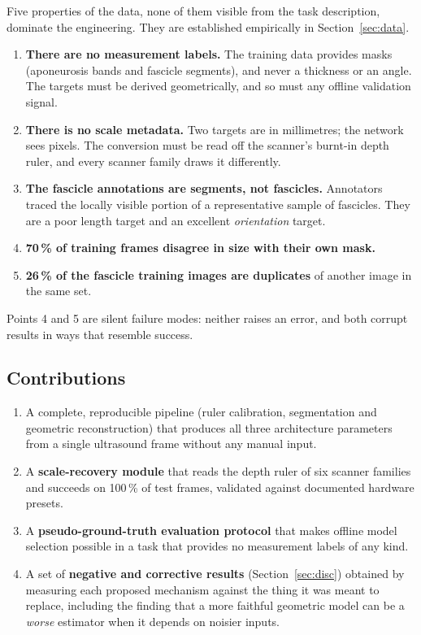 \documentclass[11pt,a4paper]{article}
\begin{document}
Five properties of the data, none of them visible from the task description,
dominate the engineering. They are established empirically in
Section~\ref{sec:data}.

\begin{enumerate}
  \item \textbf{There are no measurement labels.} The training data provides
        masks (aponeurosis bands and fascicle segments), and never a
        thickness or an angle. The targets must be derived geometrically, and so
        must any offline validation signal.
  \item \textbf{There is no scale metadata.} Two targets are in millimetres; the
        network sees pixels. The conversion must be read off the scanner's
        burnt-in depth ruler, and every scanner family draws it differently.
  \item \textbf{The fascicle annotations are segments, not fascicles.}
        Annotators traced the locally visible portion of a representative sample
        of fascicles. They are a poor length target and an excellent
        \emph{orientation} target.
  \item \textbf{70\,\% of training frames disagree in size with their own mask.}
  \item \textbf{26\,\% of the fascicle training images are duplicates} of another
        image in the same set.
\end{enumerate}

Points 4 and 5 are silent failure modes: neither raises an error, and both
corrupt results in ways that resemble success.

\subsection{Contributions}

\begin{enumerate}
  \item A complete, reproducible pipeline (ruler calibration, segmentation
        and geometric reconstruction) that produces all three architecture
        parameters from a single ultrasound frame without any manual input.
  \item A \textbf{scale-recovery module} that reads the depth ruler of six
        scanner families and succeeds on 100\,\% of test frames, validated
        against documented hardware presets.
  \item A \textbf{pseudo-ground-truth evaluation protocol} that makes offline
        model selection possible in a task that provides no measurement labels
        of any kind.
  \item A set of \textbf{negative and corrective results} (Section~\ref{sec:disc})
        obtained by measuring each proposed mechanism against the thing it was
        meant to replace, including the finding that a more faithful geometric
        model can be a \emph{worse} estimator when it depends on noisier inputs.
\end{enumerate}
\end{document}
